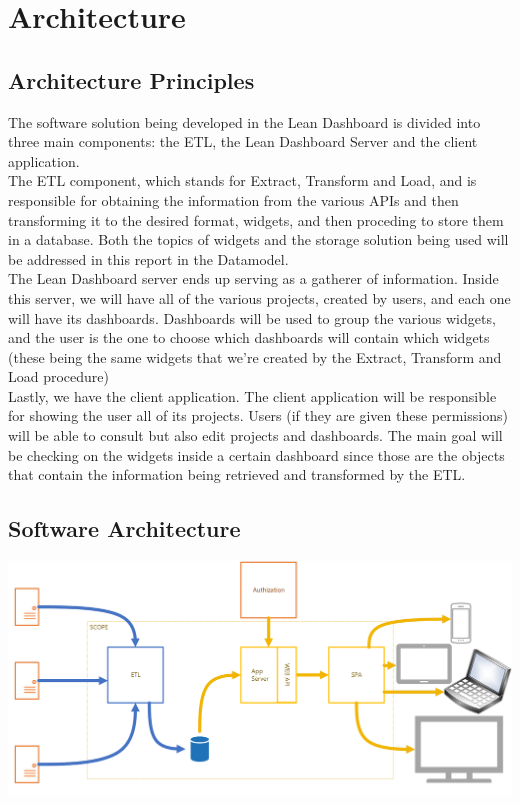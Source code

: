 \documentclass[a4paper,twoside,10pt]{report}
\begin{document}
\section{Architecture}
\subsection{Architecture Principles}
The software solution being developed in the Lean Dashboard is divided into three main components: the ETL\cite{ETLPROC}, the Lean Dashboard Server and the client application.
\\ \newline
The ETL component, which stands for Extract, Transform and Load, and is responsible for obtaining the information from the various APIs and then transforming it to the desired format, widgets, and then proceding to store them in a database. Both the topics of widgets and the storage solution being used will be addressed in this report in the Datamodel.
\\ \newline
The Lean Dashboard server ends up serving as a gatherer of information. Inside this server, we will have all of the various projects, created by users, and each one will have its dashboards. Dashboards will be used to group the various widgets, and the user is the one to choose which dashboards will contain which widgets (these being the same widgets that we're created by the Extract, Transform and Load procedure)
\\ \newline
Lastly, we have the client application. The client application will be responsible for showing the user all of its projects. Users (if they are given these permissions) will be able to consult but also edit projects and dashboards. The main goal will be checking on the widgets inside a certain dashboard since those are the objects that contain the information being retrieved and transformed by the ETL.

\newpage
\subsection{Software Architecture}

\begin{center}
    \includegraphics[width=\textwidth]{lean-dashboard-software-architecture.png}
\end{center}
\end{document}
